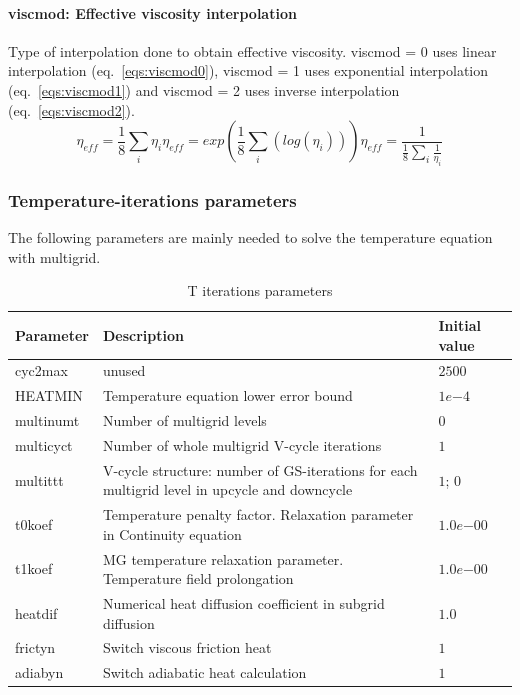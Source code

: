 \begin{table}[H]
\paragraph{viscmod: Effective viscosity interpolation}
Type of interpolation done to obtain effective viscosity. viscmod = 0 uses linear interpolation (eq.~\ref{eqs:viscmod0}), viscmod = 1 uses exponential interpolation (eq.~\ref{eqs:viscmod1}) and viscmod = 2 uses inverse interpolation (eq.~\ref{eqs:viscmod2}).
\begin{subequations}
\begin{equation}\label{eqs:viscmod0}
\eta_{eff}=\dfrac{1}{8}\sum_{i}\eta_i
\end{equation}
\begin{equation}\label{eqs:viscmod1}
\eta_{eff}=exp{\left(\dfrac{1}{8}\sum_{i}\left(log\left(\eta_i\right)\right)\right)}
\end{equation}
\begin{equation}\label{eqs:viscmod2}
\eta_{eff}=\dfrac{1}{\frac{1}{8}\sum\limits_{i}{\frac{1}{\eta_i}}}
\end{equation}
\end{subequations}

\subsubsection{Temperature-iterations parameters}
The following parameters are mainly needed to solve the temperature equation with multigrid.

\begin{table}[H]
\small
\centering
\begin{tabular}{l p{9cm} l}
\toprule
Parameter & Description & Initial value \\
\midrule
cyc2max 	& unused & $2500$\\
HEATMIN 	& Temperature equation lower error bound & $1e{-4}$\\
multinumt 	& Number of multigrid levels & $0$\\
multicyct 	& Number of whole multigrid V-cycle iterations & $1$ \\
multittt	& V-cycle structure: number of GS-iterations for each multigrid level in upcycle and downcycle & $1$; $0$ \\
t0koef 		& Temperature penalty factor. Relaxation parameter in Continuity equation & $1.0e{-00}$\\
t1koef 		& MG temperature relaxation parameter. Temperature field prolongation & $1.0e{-00}$\\
heatdif 	& Numerical heat diffusion coefficient in subgrid diffusion & $1.0$\\
frictyn 	& Switch viscous friction heat & $1$\\
adiabyn 	& Switch adiabatic heat calculation & $1$\\
\bottomrule
\end{tabular}
\caption{T iterations parameters}
\label{tbl:mode_t_parameters}
\end{table}


\end{table}
